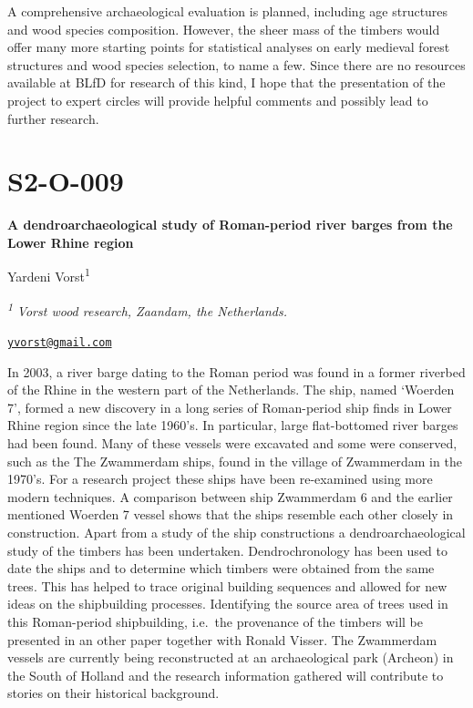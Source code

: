\documentclass[
]{book}
\begin{document}
A comprehensive archaeological evaluation is planned, including age structures and wood species composition. However, the sheer mass of the timbers would offer many more starting points for statistical analyses on early medieval forest structures and wood species selection, to name a few. Since there are no resources available at BLfD for research of this kind, I hope that the presentation of the project to expert circles will provide helpful comments and possibly lead to further research.

\hypertarget{s2-o-009}{%
\section*{S2-O-009}\label{s2-o-009}}

\textbf{A dendroarchaeological study of Roman-period river barges from the Lower Rhine region}

Yardeni Vorst\textsuperscript{1}

\textsuperscript{\emph{1}} \emph{Vorst wood research, Zaandam, the Netherlands.}

\href{mailto:yvorst@gmail.com}{\nolinkurl{yvorst@gmail.com}}

In 2003, a river barge dating to the Roman period was found in a former riverbed of the Rhine in the western part of the Netherlands. The ship, named `Woerden 7', formed a new discovery in a long series of Roman-period ship finds in Lower Rhine region since the late 1960's. In particular, large flat-bottomed river barges had been found. Many of these vessels were excavated and some were conserved, such as the The Zwammerdam ships, found in the village of Zwammerdam in the 1970's. For a research project these ships have been re-examined using more modern techniques. A comparison between ship Zwammerdam 6 and the earlier mentioned Woerden 7 vessel shows that the ships resemble each other closely in construction. Apart from a study of the ship constructions a dendroarchaeological study of the timbers has been undertaken. Dendrochronology has been used to date the ships and to determine which timbers were obtained from the same trees. This has helped to trace original building sequences and allowed for new ideas on the shipbuilding processes. Identifying the source area of trees used in this Roman-period shipbuilding, i.e.~the provenance of the timbers will be presented in an other paper together with Ronald Visser. The Zwammerdam vessels are currently being reconstructed at an archaeological park (Archeon) in the South of Holland and the research information gathered will contribute to stories on their historical background.
\end{document}
